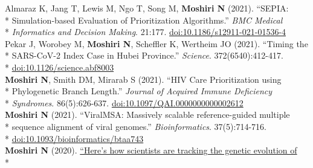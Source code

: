 \documentclass[margin,line]{res}
\begin{document}
\begin{resume}
\hspace*{4mm} Almaraz K, Jang T, Lewis M, Ngo T, Song M, \textbf{Moshiri N} (2021). ``SEPIA:\\*
\hspace*{9.5mm} Simulation-based Evaluation of Prioritization Algorithms.'' \textit{BMC Medical}\\*\vspace{2mm}
\hspace*{8mm} \textit{Informatics and Decision Making}. 21:177. \href{https://doi.org/10.1186/s12911-021-01536-4}{doi:10.1186/s12911-021-01536-4}\\
\hspace*{4mm} Pekar J, Worobey M, \textbf{Moshiri N}, Scheffler K, Wertheim JO (2021). ``Timing the\\*
\hspace*{9.5mm} SARS-CoV-2 Index Case in Hubei Province.'' \textit{Science}. 372(6540):412-417.\\*\vspace{2mm}
\hspace*{8mm} \href{https://doi.org/10.1126/science.abf8003}{doi:10.1126/science.abf8003}\\
\hspace*{4mm} \textbf{Moshiri N}, Smith DM, Mirarab S (2021). ``HIV Care Prioritization using\\*
\hspace*{9.5mm} Phylogenetic Branch Length.'' \textit{Journal of Acquired Immune Deficiency}\\*\vspace{2mm}
\hspace*{8mm} \textit{Syndromes}. 86(5):626-637. \href{https://doi.org/10.1097/QAI.0000000000002612}{doi:10.1097/QAI.0000000000002612}\\
\hspace*{4mm} \textbf{Moshiri N} (2021). ``ViralMSA: Massively scalable reference-guided multiple\\*
\hspace*{9.5mm} sequence alignment of viral genomes.'' \textit{Bioinformatics}. 37(5):714-716.\\*\vspace{2mm}
\hspace*{8mm} \href{https://doi.org/10.1093/bioinformatics/btaa743}{doi:10.1093/bioinformatics/btaa743}\\
\hspace*{4mm} \textbf{Moshiri N} (2020). \href{https://theconversation.com/heres-how-scientists-are-tracking-the-genetic-evolution-of-covid-19-134201}{``Here's how scientists are tracking the genetic evolution of}\\*\vspace{2mm}

\end{resume}
\end{document}
